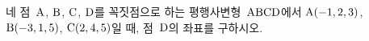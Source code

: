 네 점~$\mathrm{A}$, $\mathrm{B}$, $\mathrm{C}$, $\mathrm{D}$를 꼭짓점으로 하는 평행사변형~$\mathrm{ABCD}$에서 $\mathrm{A}(-1{,}\mkern3mu\mathopen{}2{,}\mkern3mu\mathopen{}3)$, $\mathrm{B}(-3{,}\mkern3mu\mathopen{}1{,}\mkern3mu\mathopen{}5)$, $\mathrm{C}(2{,}\mkern3mu\mathopen{}4{,}\mkern3mu\mathopen{}5)$일 때, 점~$\mathrm{D}$의 좌표를 구하시오.
